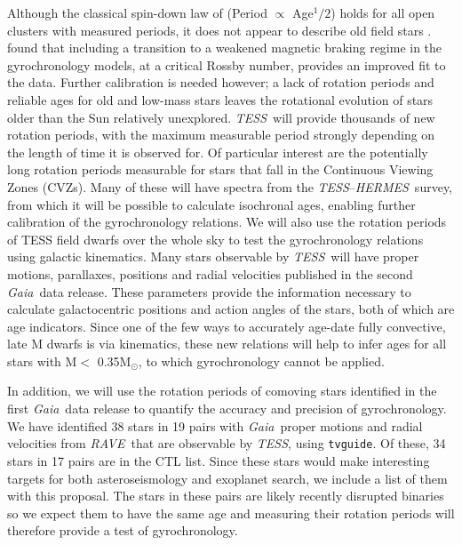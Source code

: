 \documentclass[letterpaper,12pt,preprint]{hack_aastex}
\newcommand{\TESS}{{\it TESS}}
\newcommand{\tess}{{\it TESS}}
\newcommand{\Gaia}{{\it Gaia}}
\newcommand{\RAVE}{{\it RAVE}}
\newcommand{\HERMES}{{\it HERMES}}
\begin{document}
Although the classical spin-down law of \citet{skumanich1972} (Period
$\propto$ Age$^1/2$) holds for all open clusters with measured periods, it does
not appear to describe old field stars \citep{angus2015, van-saders2016}.
\citet{van-saders2016} found that including a transition to a weakened magnetic
braking regime in the gyrochronology models, at a critical Rossby number,
provides an improved fit to the data.
Further calibration is needed however; a lack of rotation periods and reliable
ages for old and low-mass stars leaves the rotational evolution of stars older
than the Sun relatively unexplored.
\TESS\ will provide thousands of new rotation periods, with the maximum
measurable period strongly depending on the length of time it is observed for.
Of particular interest are the potentially long rotation periods measurable
for stars that fall in the Continuous Viewing Zones (CVZs).
Many of these will have spectra from the \TESS --\HERMES\ survey, from which it
will be possible to calculate isochronal ages, enabling further calibration of
the gyrochronology relations.
We will also use the rotation periods of TESS field dwarfs over the whole sky
to test the gyrochronology relations using galactic kinematics.
Many stars observable by \tess\ will have proper motions, parallaxes,
positions and radial velocities published in the second \Gaia\ data release.
These parameters provide the information necessary to calculate galactocentric
positions and action angles of the stars, both of which are age indicators.
Since one of the few ways to accurately age-date fully convective, late M
dwarfs is via kinematics, these new relations will help to infer ages for all
stars with M$<$ 0.35M$_\odot$, to which gyrochronology cannot be applied.

In addition, we will use the rotation periods of comoving stars identified in
the first \Gaia\ data release \citep{oh2016} to quantify the accuracy and
precision of gyrochronology.
We have identified 38 stars in 19 pairs with \Gaia\ proper motions and radial
velocities from \RAVE\ that are observable by \TESS, using {\tt tvguide}.
Of these, 34 stars in 17 pairs are in the CTL list.
Since these stars would make interesting targets for both asteroseismology and
exoplanet search, we include a list of them with this proposal.
The stars in these pairs are likely recently disrupted binaries so we
expect them to have the same age and measuring their rotation periods will
therefore provide a test of gyrochronology.
\end{document}
